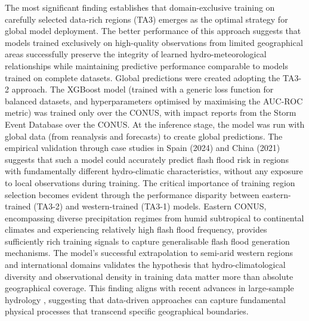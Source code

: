 The most significant finding establishes that domain-exclusive training on carefully selected data-rich regions (TA3) emerges as the optimal strategy for global model deployment. The better performance of this approach suggests that models trained exclusively on high-quality observations from limited geographical areas successfully preserve the integrity of learned hydro-meteorological relationships while maintaining predictive performance comparable to models trained on complete datasets. Global predictions were created adopting the TA3-2 approach. The  XGBoost model (trained with a generic loss function for balanced datasets, and hyperparameters optimised by maximising the AUC-ROC metric) was trained only over the CONUS, with impact reports from the Storm Event Database over the CONUS. At the inference stage, the model was run with global data (from reanalysis and forecasts) to create global predictions. The empirical validation through case studies in Spain (2024) and China (2021) suggests that such a model could accurately predict flash flood risk in regions with fundamentally different hydro-climatic characteristics, without any exposure to local observations during training. The critical importance of training region selection becomes evident through the performance disparity between eastern-trained (TA3-2) and western-trained (TA3-1) models. Eastern CONUS, encompassing diverse precipitation regimes from humid subtropical to continental climates and experiencing relatively high flash flood frequency, provides sufficiently rich training signals to capture generalisable flash flood generation mechanisms. The model's successful extrapolation to semi-arid western regions and international domains validates the hypothesis that hydro-climatological diversity and observational density in training data matter more than absolute geographical coverage. This finding aligns with recent advances in large-sample hydrology \citep{Kratzert_2024}, suggesting that data-driven approaches can capture fundamental physical processes that transcend specific geographical boundaries.

